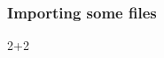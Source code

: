 \documentclass{beamer}\usepackage[]{graphicx}\usepackage[]{color}
\makeatletter
\newcommand{\hlnum}[1]{\textcolor[rgb]{0.686,0.059,0.569}{#1}}%
\newcommand{\hlopt}[1]{\textcolor[rgb]{0,0,0}{#1}}%
\newcommand{\hlstd}[1]{\textcolor[rgb]{0.345,0.345,0.345}{#1}}%
\newenvironment{kframe}{%
 \def\at@end@of@kframe{}%
 \ifinner\ifhmode%
  \def\at@end@of@kframe{\end{minipage}}%
  \begin{minipage}{\columnwidth}%
 \fi\fi%
 \def\FrameCommand##1{\hskip\@totalleftmargin \hskip-\fboxsep
 \colorbox{shadecolor}{##1}\hskip-\fboxsep
     \hskip-\linewidth \hskip-\@totalleftmargin \hskip\columnwidth}%
 \MakeFramed {\advance\hsize-\width
   \@totalleftmargin\z@ \linewidth\hsize
   \@setminipage}}%
 {\par\unskip\endMakeFramed%
 \at@end@of@kframe}
\newenvironment{knitrout}{}{} %
\makeatother
\begin{document}
\begin{frame}[fragile]
\frametitle{Importing some files}
\begin{knitrout}
\color{fgcolor}\begin{kframe}
\noindent
\ttfamily
\hlstd{}\hlnum{2}\hlstd{}\hlopt{+}\hlstd{}\hlnum{2}\hlstd{}\hspace*{\fill}
\mbox{}
\normalfont
\end{kframe}
\end{knitrout}
\end{frame}
\end{document}
